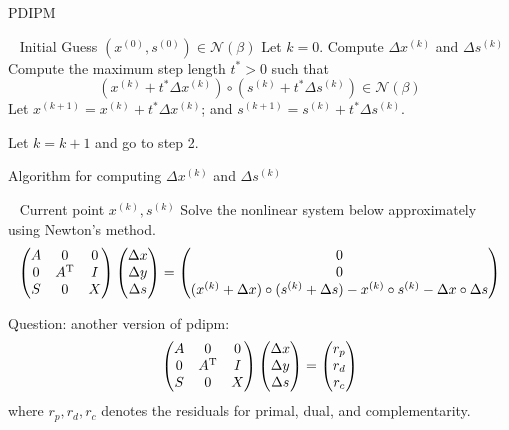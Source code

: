 \begin{algorithm}[htb] 
\caption{PDIPM} 
\label{alg:CFA} 
\begin{algorithmic}[1] %
\REQUIRE ~ %
Initial Guess $(x^{(0)},s^{(0)})\in\mathcal{N}(\beta)$
\STATE Let $k=0$.
\STATE Compute $\Delta x^{(k)}$ and $\Delta s^{(k)}$
\STATE Compute the maximum step length $t^*>0$ such that 
\[
(x^{(k)}+t^*\Delta x^{(k)})\circ(s^{(k)}+t^*\Delta s^{(k)})\in\mathcal{N}(\beta)
\]
\STATE Let $x^{(k+1)} = x^{(k)} + t^*\Delta x^{(k)}$; and $s^{(k+1)} = s^{(k)} + t^*\Delta s^{(k)}$.

Let $k=k+1$ and go to step 2.
\end{algorithmic}
\end{algorithm}
\begin{algorithm}[htb] 
\caption{Algorithm for computing $\Delta x^{(k)}$ and $\Delta s^{(k)}$} 
\label{alg:CFA} 
\begin{algorithmic}[1] %
\REQUIRE ~ %
Current point $x^{(k)},s^{(k)}$
\STATE Solve the nonlinear system below approximately using Newton's method.
\[
\begin{pmatrix}
A&0&0\\
0&A^{\mathrm T}&I\\
S&0&X
\end{pmatrix}\begin{pmatrix}
\Delta x\\\Delta y\\\Delta s
\end{pmatrix}
=\begin{pmatrix}
0\\0\\(x^{(k)}+\Delta x)\circ(s^{(k)}+\Delta s) - x^{(k)}\circ s^{(k)} - \Delta x\circ\Delta s
\end{pmatrix}
\]
\end{algorithmic}
\end{algorithm}

Question: another version of pdipm:
\[
\begin{pmatrix}
A&0&0\\
0&A^{\mathrm T}&I\\
S&0&X
\end{pmatrix}\begin{pmatrix}
\Delta x\\\Delta y\\\Delta s
\end{pmatrix}
=\begin{pmatrix}
r_p\\r_d\\r_c
\end{pmatrix}
\]
where $r_p,r_d,r_c$ denotes the residuals for primal, dual, and complementarity.


















